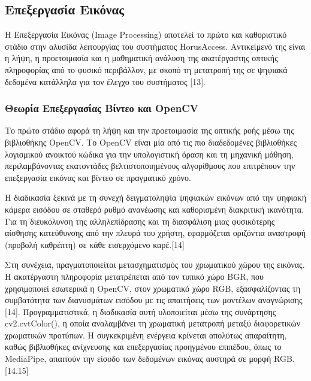 \documentclass[twoside, a4paper, 11pt]{article}
\newcommand{\textlatin}[1]{\textenglish{#1}}
\begin{document}
\subsection{Επεξεργασία Εικόνας}
Η Επεξεργασία Εικόνας (\textlatin{Image Processing}) αποτελεί το πρώτο και καθοριστικό στάδιο στην αλυσίδα λειτουργίας του συστήματος \textlatin{HorusAccess}. Αντικείμενό της είναι η λήψη, η προετοιμασία και η μαθηματική ανάλυση της ακατέργαστης οπτικής πληροφορίας από το φυσικό περιβάλλον, με σκοπό τη μετατροπή της σε ψηφιακά δεδομένα κατάλληλα για τον έλεγχο του συστήματος [13].

\subsubsection{Θεωρία Επεξεργασίας Βίντεο και OpenCV}

Το πρώτο στάδιο αφορά τη λήψη και την προετοιμασία της οπτικής ροής μέσω της βιβλιοθήκης OpenCV.
Το OpenCV είναι μία από τις πιο διαδεδομένες βιβλιοθήκες λογισμικού ανοικτού κώδικα για την υπολογιστική όραση και
τη μηχανική μάθηση, περιλαμβάνοντας εκατοντάδες βελτιστοποιημένους αλγορίθμους που επιτρέπουν την επεξεργασία εικόνας και βίντεο σε πραγματικό χρόνο.

Η διαδικασία ξεκινά με τη συνεχή δειγματοληψία ψηφιακών εικόνων από την ψηφιακή κάμερα εισόδου σε σταθερό ρυθμό ανανέωσης και 
καθορισμένη διακριτική ικανότητα. Για τη διευκόλυνση της αλληλεπίδρασης και τη διασφάλιση μιας φυσικότερης αίσθησης κατεύθυνσης 
από την πλευρά του χρήστη, εφαρμόζεται οριζόντια αναστροφή (προβολή καθρέπτη) σε κάθε εισερχόμενο καρέ.[14]

Στη συνέχεια, πραγματοποιείται μετασχηματισμός του χρωματικού χώρου της εικόνας.
Η ακατέργαστη πληροφορία μετατρέπεται από τον τυπικό χώρο BGR, που χρησιμοποιεί εσωτερικά η OpenCV, στον χρωματικό χώρο RGB, εξασφαλίζοντας
τη συμβατότητα των διανυσμάτων εισόδου με τις απαιτήσεις των μοντέλων αναγνώρισης [14]. 
Προγραμματιστικά, η διαδικασία αυτή υλοποιείται μέσω της συνάρτησης cv2.cvtColor(), η οποία αναλαμβάνει τη χρωματική μετατροπή μεταξύ διαφορετικών χρωματικών προτύπων.
Η συγκεκριμένη ενέργεια κρίνεται απολύτως απαραίτητη, καθώς βιβλιοθήκες ανίχνευσης και επεξεργασίας προηγμένου επιπέδου, όπως το MediaPipe, απαιτούν την είσοδο των δεδομένων εικόνας αυστηρά σε μορφή RGB.[14.15]
\end{document}
